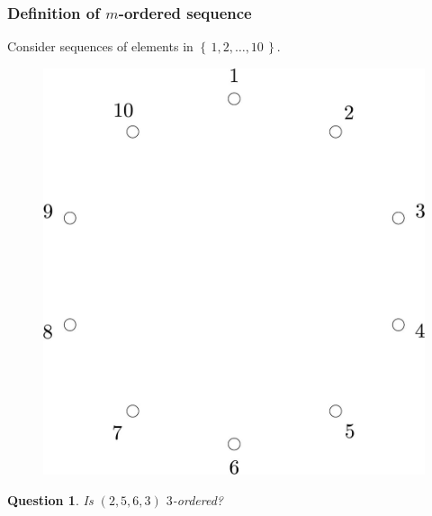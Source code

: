 \documentclass{beamer}
\theoremstyle{plain}
\newtheorem{question}[theorem]{Question}
\theoremstyle{definition}
\theoremstyle{remark}
\renewcommand{\'}{\hspace{0.5mm}'}		%
\renewcommand{\Set}[1]{\left\{\,#1\,\right\}}	%
\begin{document}
\begin{frame}
\frametitle{Definition of $m$-ordered sequence}

	Consider sequences of elements in $\Set{1,2,\hdots, 10}$. 

	\begin{figure}
		\includegraphics[scale=0.1]{circ_10.jpg}
	\end{figure}
	
	\begin{question}
		Is $(2,5,6,3)$ $3$-ordered?
	\end{question}
	
\end{frame}

\end{document}
